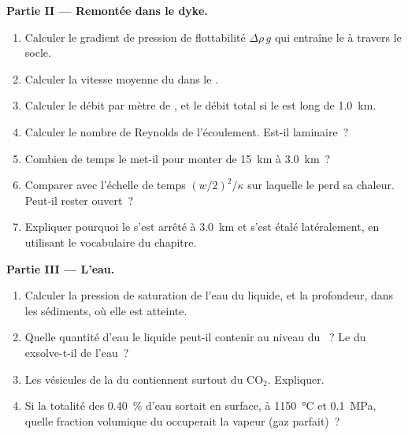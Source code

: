 \begin{problem}
\noindent\textbf{Partie II --- Remontée dans le dyke.}
\begin{enumerate}[resume]
\item Calculer le gradient de pression de flottabilité $\Delta\rho\,g$ qui entraîne le 
à travers le socle.
\item Calculer la vitesse moyenne du  dans le .
\item Calculer le débit par mètre de , et le débit total si le  est
long de \qty{1.0}{km}.
\item Calculer le nombre de Reynolds de l'écoulement. Est-il laminaire~?
\item Combien de temps le  met-il pour monter de \qty{15}{km} à \qty{3.0}{km}~?
\item Comparer avec l'échelle de temps $(w/2)^2/\kappa$ sur laquelle le  perd sa
chaleur. Peut-il rester ouvert~?
\item Expliquer pourquoi le  s'est arrêté à \qty{3.0}{km} et s'est étalé latéralement, en utilisant
le vocabulaire du chapitre.
\end{enumerate}

\noindent\textbf{Partie III --- L'eau.}
\begin{enumerate}[resume]
\item Calculer la pression de saturation de l'eau du liquide, et la profondeur, dans les
sédiments, où elle est atteinte.
\item Quelle quantité d'eau le liquide peut-il contenir au niveau du ~? Le  du 
exsolve-t-il de l'eau~?
\item Les vésicules de la  du  contiennent surtout du CO$_2$. Expliquer.
\item Si la totalité des \qty{0.40}{\percent} d'eau sortait en surface, à
\qty{1150}{\celsius} et \qty{0.1}{MPa}, quelle fraction volumique du  occuperait
la vapeur (gaz parfait)~?
\end{enumerate}


\end{problem}
